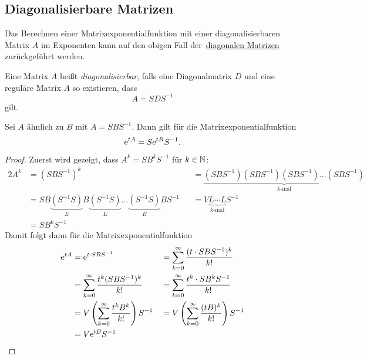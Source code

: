 \subsection{Diagonalisierbare Matrizen}\label{subsec:diagonalisierbare-matrizen}
Das Berechnen einer Matrixexponentialfunktion mit einer diagonalisierbaren Matrix $A$ im Exponenten
kann auf den obigen Fall der~\hyperref[subsec:diagonale-matrizen]{diagonalen Matrizen} zurückgeführt werden.

\begin{definition}[Wiederholung]
    Eine Matrix $A$ heißt \emph{diagonalisierbar}, falls eine Diagonalmatrix $D$ und eine reguläre Matrix $A$ so existieren, dass
    \begin{equation*}
        A = S D S^{-1}
    \end{equation*}
    gilt.
\end{definition}

\begin{lemma}\label{thm:matrixexponential-diagonalisierbar}
    Sei $A$ ähnlich zu $B$ mit $A = S B S^{-1}$.
    Dann gilt für die Matrixexponentialfunktion
    \begin{equation*}
        \mathrm{e}^{t A} = S \mathrm{e}^{t B} S^{-1}.
    \end{equation*}
\end{lemma}

\begin{proof}
    Zuerst wird gezeigt, dass $A^k = S B^k S^{-1}$ für $k \in \mathbb{N}$:
    \begin{alignat*}{2}
        A^k &= (S B S^{-1})^k &&= \underbrace{(S B S^{-1}) (S B S^{-1}) (S B S^{-1}) \dots (S B S^{-1})}_{k \text{-mal}}\\
            &= SB\underbrace{(S^{-1} S)}_{E} B \underbrace{(S^{-1} S)}_{E} \dots \underbrace{(S^{-1} S)}_{E} B S^{-1}
                &&= V \underbrace{L \cdots L}_{k \text{-mal}} S^{-1}\\
            &= S B^k S^{-1}
    \end{alignat*}
    Damit folgt dann für die Matrixexponentialfunktion
    \begin{alignat*}{2}
        \mathrm{e}^{t A} &= \mathrm{e}^{t \cdot S B S^{-1}} &&= \sum^\infty_{k=0} \frac{(t \cdot S B S^{-1})^k}{k!}\\
                 &= \sum^\infty_{k=0} \frac{t^k (S B S^{-1})^k}{k!} &&= \sum^\infty_{k=0} \frac{t^k \cdot S B^k S^{-1}}{k!}\\
                 &= V \left( \sum^\infty_{k=0} \frac{t^k B^k}{k!} \right) S^{-1} &&= V \left( \sum^\infty_{k=0} \frac{(t B)^k}{k!} \right) S^{-1}\\
                 &= V \mathrm{e}^{t B} S^{-1}
    \end{alignat*}
\end{proof}


